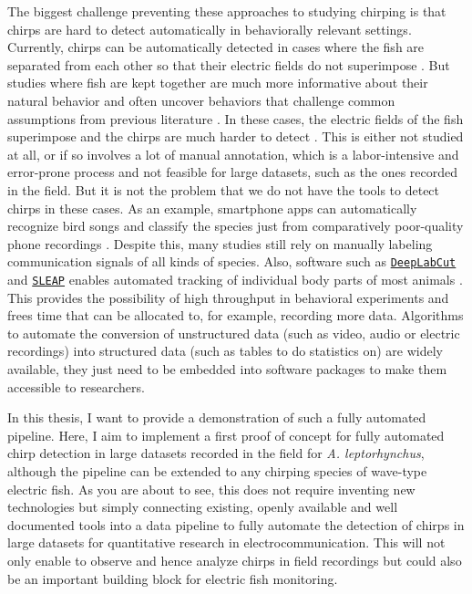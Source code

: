 The biggest challenge preventing these approaches to studying chirping is that
chirps are hard to detect automatically in behaviorally relevant settings.
Currently, chirps can be automatically detected in cases where the fish are
separated from each other so that their electric fields do not superimpose
\parencite{lehotzkySupervisedLearningAlgorithm2023,
eskeEffectUrethaneMS2222023, fieldJARChirpsGymnotiform2019}. But studies where
fish are kept together are much more informative about their natural behavior
and often uncover behaviors that challenge common assumptions from previous
literature \parencite{henningerStatisticsNaturalCommunication2018,
fortuneSpookyInteractionDistance2020a}. In these cases, the electric fields of
the fish superimpose and the chirps are much harder to detect
\parencite{obotiWhyBrownGhost2023,henningerStatisticsNaturalCommunication2018}.
This is either not studied at all, or if so involves a lot of manual
annotation, which is a labor-intensive and error-prone process and not feasible
for large datasets, such as the ones recorded in the field. But it is not the
problem that we do not have the tools to detect chirps in these cases. As an
example, smartphone apps can automatically recognize bird songs and classify
the species just from comparatively poor-quality phone recordings
\parencite{kahlBirdNETDeepLearning2021}. Despite this, many studies still rely
on manually labeling communication signals of all kinds of species. Also,
software such as
\href{http://www.mackenziemathislab.org/deeplabcut}{\texttt{DeepLabCut}} and
\href{https://sleap.ai/}{\texttt{SLEAP}} enables automated tracking of
individual body parts of most animals \parencite{pereiraSLEAPDeepLearning2022a,
lauerMultianimalPoseEstimation2022}. This provides the possibility of high
throughput in behavioral experiments and frees time that can be allocated to,
for example, recording more data. Algorithms to automate the conversion of
unstructured data (such as video, audio or electric recordings) into structured
data (such as tables to do statistics on) are widely available, they just need
to be embedded into software packages to make them accessible to researchers.

In this thesis, I want to provide a demonstration of such a fully automated
pipeline. Here, I aim to implement a first proof of concept for fully automated
chirp detection in large datasets recorded in the field for \textit{A.
leptorhynchus}, although the pipeline can be extended to any chirping species
of wave-type electric fish. As you are about to see, this does not require
inventing new technologies but simply connecting existing, openly available and
well documented tools into a data pipeline to fully automate the detection of
chirps in large datasets for quantitative research in electrocommunication.
This will not only enable to observe and hence analyze chirps in field
recordings but could also be an important building block for electric fish
monitoring.

